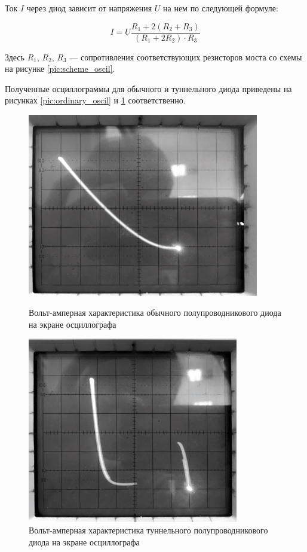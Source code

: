 \documentclass[12pt]{kiarticle}
\begin{document}
	Ток $I$ через диод зависит от напряжения $U$ на нем по следующей формуле: 
	
	\[ I = U \frac{R_1 + 2(R_2 + R_3)}{(R_1 + 2R_2) \cdot R_3} \]
	
	Здесь $R_1$, $R_2$, $R_3$ --- сопротивления соответствующих резисторов моста со схемы на рисунке \ref{pic:scheme_oscil}. 
	
	Полученные осциллограммы для обычного и туннельного диода приведены на рисунках \ref{pic:ordinary_oscil} и \ref{pic:tunnel_oscil} соответственно. 
	
		\begin{figure}[h]
		\begin{minipage}[h]{0.49\linewidth}
		\centering	
		\includegraphics[width=0.9\textwidth]{o1.png}
		\caption{Вольт-амперная характеристика обычного полупроводникового диода на экране осциллографа}
		\label{pic:ordinary_oscil}
		\end{minipage}
		\begin{minipage}[h]{0.49\linewidth}
			\centering	
		\includegraphics[width=0.82\textwidth]{o2.png}
		\caption{Вольт-амперная характеристика туннельного полупроводникового диода на экране осциллографа}
		\label{pic:tunnel_oscil}
		\end{minipage}
	\end{figure}
	
\end{document}
